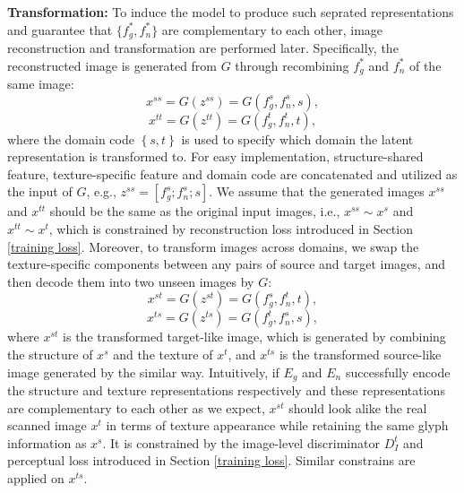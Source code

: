 \documentclass[10pt,journal,compsoc,twocolumn ]{IEEEtran}
\begin{document}
\textbf{Transformation:} To induce the model to produce such seprated representations and guarantee that $\{f^*_g,f^*_n\}$ are complementary to each other, image reconstruction and transformation are performed later. Specifically, the reconstructed image is generated from $G$ through recombining $f^*_g$ and $f^*_n$ of the same image:
\begin{equation}
x^{ss}=G\left ( z^{ss} \right )=G\left ( f_g^s,f_n^s,s \right ),
\end{equation}
\begin{equation}
x^{tt}=G\left ( z^{tt} \right )=G\left ( f_g^t,f_n^t,t \right ), \label{decoder_reconstruct}
\end{equation}
where the domain code $\left \{ s,t \right \}$ is used to specify which domain the latent representation is transformed to. For easy implementation, structure-shared feature, texture-specific feature and domain code are concatenated and utilized as the input of $G$, e.g., $z^{ss}=[f_g^s; f_n^s; s]$. We assume that the generated images $x^{ss}$ and $x^{tt}$ should be the same as the original input images, i.e., $x^{ss}\sim x^s$ and $x^{tt}\sim x^t$, which is constrained by reconstruction loss introduced in Section \ref{training loss}. Moreover, to transform images across domains, we swap the texture-specific components between any pairs of source and target images, and then decode them into two unseen images by $G$:
\begin{equation}
x^{st}=G\left ( z^{st} \right )=G\left ( f_g^s,f_n^t,t \right ),
\end{equation}
\begin{equation}
x^{ts}=G\left ( z^{ts} \right )=G\left ( f_g^t,f_n^s,s \right ), \label{decoder_transform}
\end{equation}
where $x^{st}$ is the transformed target-like image, which is generated by combining the structure of $x^s$ and the texture of $x^t$, and $x^{ts}$ is the transformed source-like image generated by the similar way. Intuitively, if $E_g$ and $E_n$ successfully encode the structure and texture representations respectively and these representations are complementary to each other as we expect, $x^{st}$ should look alike the real scanned image $x^t$ in terms of texture appearance while retaining the same glyph information as $x^s$. It is constrained by the image-level discriminator $D^t_I$ and perceptual loss introduced in Section \ref{training loss}. Similar constrains are applied on $x^{ts}$.
\end{document}
